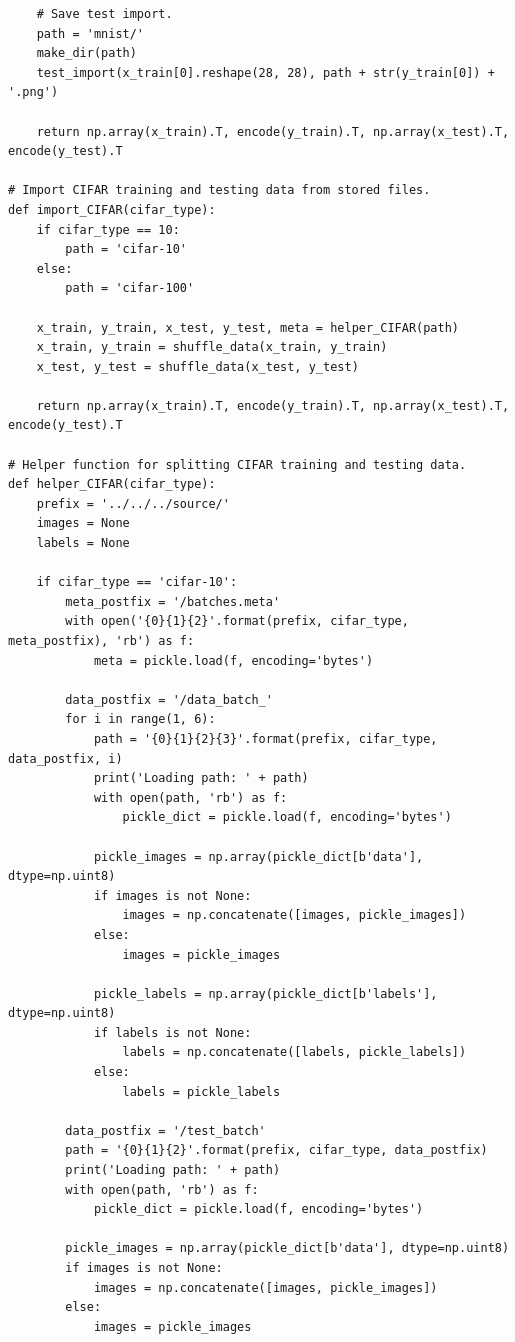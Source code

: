 \documentclass[letterpaper]{article} %
\begin{document}
{\begin{verbatim}
    # Save test import.
    path = 'mnist/'
    make_dir(path)
    test_import(x_train[0].reshape(28, 28), path + str(y_train[0]) + '.png')

    return np.array(x_train).T, encode(y_train).T, np.array(x_test).T, encode(y_test).T

# Import CIFAR training and testing data from stored files.
def import_CIFAR(cifar_type):
    if cifar_type == 10:
        path = 'cifar-10'
    else:
        path = 'cifar-100'

    x_train, y_train, x_test, y_test, meta = helper_CIFAR(path)
    x_train, y_train = shuffle_data(x_train, y_train)
    x_test, y_test = shuffle_data(x_test, y_test)

    return np.array(x_train).T, encode(y_train).T, np.array(x_test).T, encode(y_test).T

# Helper function for splitting CIFAR training and testing data.
def helper_CIFAR(cifar_type):
    prefix = '../../../source/'
    images = None
    labels = None

    if cifar_type == 'cifar-10':
        meta_postfix = '/batches.meta'
        with open('{0}{1}{2}'.format(prefix, cifar_type, meta_postfix), 'rb') as f:
            meta = pickle.load(f, encoding='bytes')

        data_postfix = '/data_batch_'
        for i in range(1, 6):
            path = '{0}{1}{2}{3}'.format(prefix, cifar_type, data_postfix, i)
            print('Loading path: ' + path)
            with open(path, 'rb') as f:
                pickle_dict = pickle.load(f, encoding='bytes')

            pickle_images = np.array(pickle_dict[b'data'], dtype=np.uint8)
            if images is not None:
                images = np.concatenate([images, pickle_images])
            else:
                images = pickle_images

            pickle_labels = np.array(pickle_dict[b'labels'], dtype=np.uint8)
            if labels is not None:
                labels = np.concatenate([labels, pickle_labels])
            else:
                labels = pickle_labels
        
        data_postfix = '/test_batch'
        path = '{0}{1}{2}'.format(prefix, cifar_type, data_postfix)
        print('Loading path: ' + path)
        with open(path, 'rb') as f:
            pickle_dict = pickle.load(f, encoding='bytes')

        pickle_images = np.array(pickle_dict[b'data'], dtype=np.uint8)
        if images is not None:
            images = np.concatenate([images, pickle_images])
        else:
            images = pickle_images


\end{verbatim}}
\end{document}

